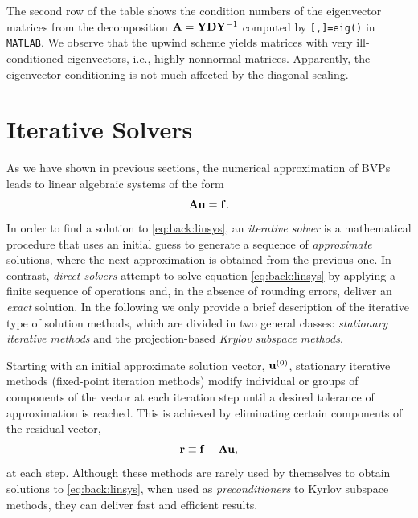The second row of the table shows the condition numbers of the eigenvector
matrices from the decomposition $\mathbf{A}=\mathbf{Y}\mathbf{D}\mathbf{Y}^{-1}$ computed by
\texttt{[\Y,\D]=eig(\A)} in \texttt{MATLAB}. We observe that the upwind scheme
yields matrices with very ill-conditioned eigenvectors, i.e., highly nonnormal
matrices. Apparently, the eigenvector conditioning is not much affected by the
diagonal scaling.

\section{Iterative Solvers}
\label{back:itersolvers}

As we have shown in previous sections, the numerical approximation of BVPs
leads to linear algebraic systems of the form
\begin{equation}
\mathbf{A}\mathbf{u}=\mathbf{f}.
\label{eq:back:linsys}
\end{equation}
In order to find a solution to \eqref{eq:back:linsys}, an
\emph{iterative solver} is a  mathematical procedure that uses an initial
guess to generate a sequence of \emph{approximate} solutions, where the next
approximation is obtained from the previous one. In contrast, \emph{direct solvers} attempt to solve equation \eqref{eq:back:linsys} by
applying a finite sequence of operations and, in the absence of rounding
errors, deliver an \emph{exact} solution. In the following we only provide a brief description of the iterative type of solution methods, which are divided in two general classes: \textit{stationary iterative methods} and the projection-based \textit{Krylov subspace methods}.

Starting with an initial approximate solution vector, $\mathbf{u}^{(0)}$, stationary
iterative methods (fixed-point iteration methods) modify individual or groups
of components of the vector at each iteration step until a desired tolerance of
approximation is reached. This is achieved by eliminating certain components of
the residual vector,
\begin{equation}
\mathbf{r}\equiv\mathbf{f}-\mathbf{A}\mathbf{u},
\label{eq:back:residual}
\end{equation}
at each step. Although these methods are rarely used by themselves to obtain solutions to \eqref{eq:back:linsys}, when used as \emph{preconditioners} to Kyrlov subspace methods, they can deliver fast and efficient results.

